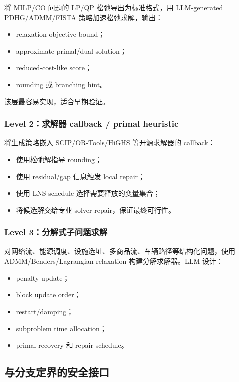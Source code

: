 \documentclass[UTF8,a4paper,12pt,fontset=fandol]{ctexart}
\begin{document}
将 MILP/CO 问题的 LP/QP 松弛导出为标准格式，用 LLM-generated PDHG/ADMM/FISTA 策略加速松弛求解，输出：
\begin{itemize}[leftmargin=2em]
    \item relaxation objective bound；
    \item approximate primal/dual solution；
    \item reduced-cost-like score；
    \item rounding 或 branching hint。
\end{itemize}
该层最容易实现，适合早期验证。

\subsubsection{Level 2：求解器 callback / primal heuristic}

将生成策略嵌入 SCIP/OR-Tools/HiGHS 等开源求解器的 callback：
\begin{itemize}[leftmargin=2em]
    \item 使用松弛解指导 rounding；
    \item 使用 residual/gap 信息触发 local repair；
    \item 使用 LNS schedule 选择需要释放的变量集合；
    \item 将候选解交给专业 solver repair，保证最终可行性。
\end{itemize}

\subsubsection{Level 3：分解式子问题求解}

对网络流、能源调度、设施选址、多商品流、车辆路径等结构化问题，使用 ADMM/Benders/Lagrangian relaxation 构建分解求解器。LLM 设计：
\begin{itemize}[leftmargin=2em]
    \item penalty update；
    \item block update order；
    \item restart/damping；
    \item subproblem time allocation；
    \item primal recovery 和 repair schedule。
\end{itemize}

\subsection{与分支定界的安全接口}
\end{document}
